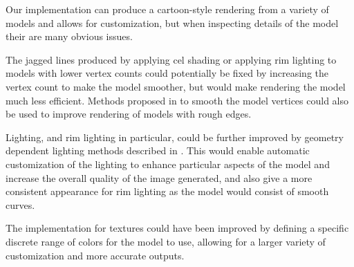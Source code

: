 Our implementation can produce a cartoon-style rendering from a variety of models and allows for customization, but when inspecting details of the model their are many obvious issues.

The jagged lines produced by applying cel shading or applying rim lighting to models with lower vertex counts could potentially be fixed by increasing the vertex count to make the model smoother, but would make rendering the model much less efficient. Methods proposed in  \cite{riyad16} to smooth the model vertices could also be used to improve rendering of models with rough edges. 

Lighting, and rim lighting in particular, could be further improved by geometry dependent lighting methods described in \cite{lee06}. This would enable automatic customization of the lighting to enhance particular aspects of the model and increase the overall quality of the image generated, and also give a more consistent appearance for rim lighting as the model would consist of smooth curves.


The implementation for textures could have been improved by defining a specific discrete range of colors for the model to use, allowing for a larger variety of customization and more accurate outputs.